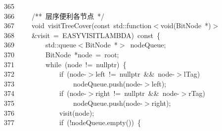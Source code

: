 \documentclass[11pt,a4paper]{ctexart}
\newcommand{\hlstd}[1]{\textcolor[rgb]{0.2,0.2,0.2}{#1}}
\newcommand{\hlcom}[1]{\textcolor[rgb]{0.59,0.59,0.59}{#1}}
\newcommand{\hlopt}[1]{\textcolor[rgb]{0.2,0.2,0.2}{#1}}
\newcommand{\hllin}[1]{\textcolor[rgb]{0.59,0.59,0.59}{#1}}
\newcommand{\hlkwa}[1]{\textcolor[rgb]{0.23,0.42,0.78}{#1}}
\newcommand{\hlkwb}[1]{\textcolor[rgb]{0.63,0,0.31}{#1}}
\newcommand{\hlkwc}[1]{\textcolor[rgb]{0,0.63,0.31}{#1}}
\newcommand{\hlkwd}[1]{\textcolor[rgb]{0.78,0.23,0.41}{#1}}
\begin{document}
\hllin{365\ }\hlstd{}\\
\hllin{366\ }\hlstd{}\hlstd{\ \ \ \ }\hlstd{}\hlcom{/{*}{*}\ 层序便利各节点\ {*}/}\hlstd{}\\
\hllin{367\ }\hlstd{}\hlstd{\ \ \ \ }\hlstd{}\hlkwb{void\ }\hlstd{}\hlkwd{visitTreeCover}\hlstd{}\hlopt{(}\hlstd{}\hlkwb{const\ }\hlstd{}\hlkwc{std}\hlstd{}\hlopt{::}\hlstd{function}\hlopt{$<$}\hlstd{}\hlkwb{void}\hlstd{}\hlopt{(}\hlstd{BitNode\ }\hlopt{{*})$>$\ }\Righttorque\\
\hllin{368\ }\hlstd{}\hlstd{\ \ \ \ }\hlstd{}\hlopt{\&}\hlstd{visit\ }\hlopt{=\ }\hlstd{EASY\textunderscore VISIT\textunderscore LAMBDA}\hlopt{)\ }\hlstd{}\hlkwb{const\ }\hlstd{}\hlopt{\{}\\
\hllin{369\ }\hlstd{}\hlstd{\ \ \ \ \ \ \ \ }\hlstd{}\hlkwc{std}\hlstd{}\hlopt{::}\hlstd{queue}\hlopt{$<$}\hlstd{BitNode\ }\hlopt{{*}$>$\ }\hlstd{nodeQueue}\hlopt{;}\\
\hllin{370\ }\hlstd{}\hlstd{\ \ \ \ \ \ \ \ }\hlstd{BitNode\ }\hlopt{{*}}\hlstd{node\ }\hlopt{=\ }\hlstd{root}\hlopt{;}\\
\hllin{371\ }\hlstd{}\hlstd{\ \ \ \ \ \ \ \ }\hlstd{}\hlkwa{while\ }\hlstd{}\hlopt{(}\hlstd{node\ }\hlopt{!=\ }\hlstd{}\hlkwc{nullptr}\hlstd{}\hlopt{)\ \{}\\
\hllin{372\ }\hlstd{}\hlstd{\ \ \ \ \ \ \ \ \ \ \ \ }\hlstd{}\hlkwa{if\ }\hlstd{}\hlopt{(}\hlstd{node}\hlopt{{-}$>$}\hlstd{left\ }\hlopt{!=\ }\hlstd{}\hlkwc{nullptr\ }\hlstd{}\hlopt{\&\&\ }\hlstd{node}\hlopt{{-}$>$}\hlstd{lTag}\hlopt{)}\\
\hllin{373\ }\hlstd{}\hlstd{\ \ \ \ \ \ \ \ \ \ \ \ \ \ \ \ }\hlstd{nodeQueue}\hlopt{.}\hlstd{}\hlkwd{push}\hlstd{}\hlopt{(}\hlstd{node}\hlopt{{-}$>$}\hlstd{left}\hlopt{);}\\
\hllin{374\ }\hlstd{}\hlstd{\ \ \ \ \ \ \ \ \ \ \ \ }\hlstd{}\hlkwa{if\ }\hlstd{}\hlopt{(}\hlstd{node}\hlopt{{-}$>$}\hlstd{right\ }\hlopt{!=\ }\hlstd{}\hlkwc{nullptr\ }\hlstd{}\hlopt{\&\&\ }\hlstd{node}\hlopt{{-}$>$}\hlstd{rTag}\hlopt{)}\\
\hllin{375\ }\hlstd{}\hlstd{\ \ \ \ \ \ \ \ \ \ \ \ \ \ \ \ }\hlstd{nodeQueue}\hlopt{.}\hlstd{}\hlkwd{push}\hlstd{}\hlopt{(}\hlstd{node}\hlopt{{-}$>$}\hlstd{right}\hlopt{);}\\
\hllin{376\ }\hlstd{}\hlstd{\ \ \ \ \ \ \ \ \ \ \ \ }\hlstd{}\hlkwd{visit}\hlstd{}\hlopt{(}\hlstd{node}\hlopt{);}\\
\hllin{377\ }\hlstd{}\hlstd{\ \ \ \ \ \ \ \ \ \ \ \ }\hlstd{}\hlkwa{if\ }\hlstd{}\hlopt{(!}\hlstd{nodeQueue}\hlopt{.}\hlstd{}\hlkwd{empty}\hlstd{}\hlopt{())\ \{}\\
\end{document}
